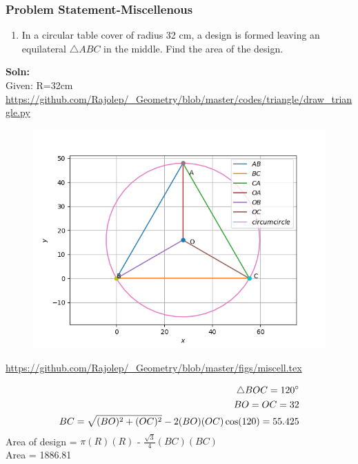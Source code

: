 \begin{frame}
\frametitle{Problem Statement-Miscellenous}
\begin{enumerate}[label=(\roman*)]
\item In a circular table cover of radius 32 cm, a design is formed leaving an equilateral $\triangle{ABC}$
in the middle. Find the area of the design.\\
\end{enumerate}
\textbf{Soln:}\\
  Given: R=32cm\\
\url{https://github.com/Rajolep/_Geometry/blob/master/codes/triangle/draw_triangle.py}
\begin{figure}
\includegraphics[scale=0.4]{./figs/misc.png}
\end{figure}
\end{frame}
\begin{frame}
\url{https://github.com/Rajolep/_Geometry/blob/master/figs/miscell.tex}
\begin{figure}

\end{figure}
\begin{align*}
\triangle{BOC} = 120\degree \\
BO=OC=32\\
BC=\sqrt{(BO)^2+(OC)^2}-2(BO)(OC)\cos(120)=55.425\\
\end{align*}
Area of design = $\pi(R)(R)$ - $\frac{\sqrt{3}}{4}(BC)(BC)$\\
Area = 1886.81
\end{frame}